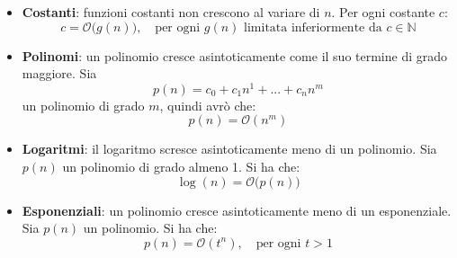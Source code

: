 \begin{itemize}
    \item \textbf{Costanti}: funzioni costanti non crescono al variare di $n$. Per ogni costante $c$:
    \[  c = \mathcal{O}\big(  g(n) \big), \quad \text{per ogni } g(n) \text{ limitata inferiormente da } c \in \mathbb{N}   \]

    \item \textbf{Polinomi}: un polinomio cresce asintoticamente come il suo termine di grado maggiore. Sia 
    \[ p(n) =  c_0 + c_1 n^1 + ... + c_n n^m  \]
    un polinomio di grado $m$, quindi avrò che:
    \[    p(n) = \mathcal{O}(n^m)  \]
    
    \item \textbf{Logaritmi}: il logaritmo scresce asintoticamente meno di un polinomio. Sia $p(n)$ un polinomio di grado almeno 1. Si ha che:
    \[    \log(n) = \mathcal{O}\big(  p(n)  \big)   \]

    \item \textbf{Esponenziali}: un polinomio cresce asintoticamente meno di un esponenziale. Sia $p(n)$ un polinomio. Si ha che:
    \[  p(n) = \mathcal{O} (t^n), \quad \text{per ogni } t > 1  \]

\end{itemize}




